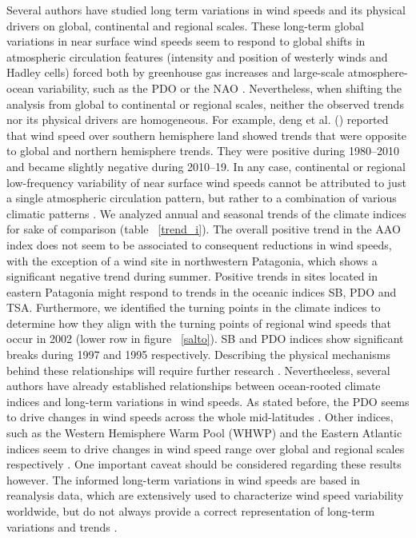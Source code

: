 \documentclass[AMA,Times1COL]{WileyNJDv5} %
\begin{document}
\begin{linenumbers}
Several authors have studied long term variations in wind speeds and its physical drivers on global, continental and regional scales. These long-term global variations in near surface wind speeds seem to respond to global shifts in atmospheric circulation features (intensity and position of westerly winds and Hadley cells) forced both by greenhouse gas increases and large-scale atmosphere-ocean variability, such as the PDO or the NAO \cite{zeng2019reversal,deng2021global,zhou2021continuous}. Nevertheless, when shifting the analysis from global to continental or regional scales, neither the observed trends nor its physical drivers are homogeneous. For example, deng et al. (\cite{deng2021global}) reported that wind speed over southern hemisphere land showed trends that were opposite to global and northern hemisphere trends. They were positive during 1980–2010 and became slightly negative during 2010–19. In any case, continental or regional low-frequency variability of near surface wind speeds cannot be attributed to just a single atmospheric circulation pattern, but rather to a combination of various climatic patterns \cite{naizghi2017teleconnections, zeng2019reversal, shen2021centennial, utrabo2022wind}. We analyzed annual and seasonal trends of the climate indices for sake of comparison (table ~\ref{trend_i}). The overall positive trend in the AAO index does not seem to be associated to consequent reductions in wind speeds, with the exception of a wind site in northwestern Patagonia, which shows a significant negative trend during summer. Positive trends in sites located in eastern Patagonia might respond to trends in the oceanic indices SB, PDO and TSA. Furthermore, we identified the turning points in the climate indices to determine how they align with the turning points of regional wind speeds that occur in 2002 (lower row in figure ~\ref{salto}). SB and PDO indices show significant breaks during 1997 and 1995 respectively. Describing the physical mechanisms behind these relationships will require further research \cite{zeng2019reversal}. Nevertheeless, several authors have already established relationships between ocean-rooted climate indices and long-term variations in wind speeds. As stated before, the PDO seems to drive changes in wind speeds across the whole mid-latitudes \cite{lledo2018investigating, zeng2019reversal}. Other indices, such as the Western Hemisphere Warm Pool (WHWP) and the Eastern Atlantic indices seem to drive changes in wind speed range over global and regional scales respectively \cite{zhou2021continuous}. One important caveat should be considered regarding these results however. The informed long-term variations in wind speeds are based in reanalysis data, which are extensively used to characterize wind speed variability worldwide, but do not always provide a correct representation of long-term variations and trends \cite{wohland2019inconsistent,merino2022wind}.


\end{linenumbers}
\end{document}

